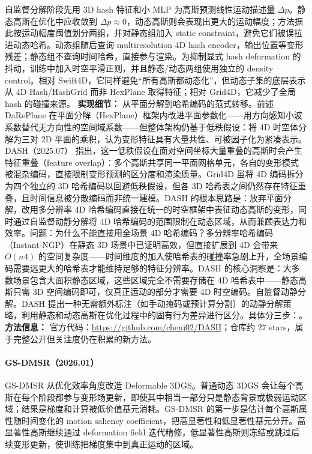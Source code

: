 自监督分解阶段先用 3D hash 特征和小 MLP 为高斯预测线性运动描述量 $\Delta p$。静态高斯在优化中应收敛到 $\Delta p\approx 0$，动态高斯则会表现出更大的运动幅度；方法据此按运动幅度阈值划分两组，并对静态组加入 static constraint，避免它们被误拉进动态哈希。动态组随后查询 multiresolution 4D hash encoder，输出位置等变形残差；静态组不查询时间哈希，直接参与渲染。为抑制显式 hash deformation 的抖动，训练中加入时空平滑正则，并且静态/动态两组使用独立的 density control。相对 Swift4D，它同样避免“所有高斯都动态化”，但动态子集的底层表示从 4D Hash/HashGrid 而非 HexPlane 取得特征；相对 Grid4D，它减少了全局 hash 的碰撞来源。
\textbf{实现细节：} 从平面分解到哈希编码的范式转移。前述 DaRePlane 在平面分解（HexPlane）框架内改进平面参数化——用方向感知小波系数替代无方向性的空间域系数——但整体架构仍基于低秩假设：将 4D 时空体分解为三对 2D 平面的乘积，认为变形特征具有大量共性、可被因子化为紧凑表示。DASH（2025.07） 指出，这一低秩假设在面对空间坐标大量重叠的高斯时会产生特征重叠（feature overlap）：多个高斯共享同一平面网格单元，各自的变形模式被混杂编码，直接限制变形预测的区分度和渲染质量。Grid4D 虽将 4D 编码拆分为四个独立的 3D 哈希编码以回避低秩假设，但各 3D 哈希表之间仍然存在特征重叠，且时间信息被分散编码而非统一建模。DASH 的根本思路是：放弃平面分解，改用多分辨率 4D 哈希编码直接在统一的时空框架中表征动态高斯的变形，同时通过自监督动静分解将 4D 哈希编码的范围限制在动态区域，从而兼顾表达力和效率。问题：为什么不能直接用全场景 4D 哈希编码？多分辨率哈希编码（Instant-NGP）在静态 3D 场景中已证明高效，但直接扩展到 4D 会带来 $O(n^{}4)$ 的空间复杂度——时间维度的加入使哈希表的碰撞率急剧上升，全场景编码需要远更大的哈希表才能维持足够的特征分辨率。DASH 的核心洞察是：大多数场景包含大面积静态区域，这些区域完全不需要存储在 4D 哈希表中——静态高斯只需 3D 空间编码即可，仅真正运动的部分才需要 4D 时空编码。自监督动静分解。DASH 提出一种无需额外标注（如手动掩码或预计算分割）的动静分解策略，利用静态和动态高斯在优化过程中的固有行为差异进行区分。具体分三步：。
\textbf{方法信息：} 官方代码：\url{https://github.com/chenj02/DASH}；仓库约 27 stars，属于完整公开但关注度仍在积累的新方法。



\paragraph{GS-DMSR（2026.01）\cite{2601_05584}}
GS-DMSR 从优化效率角度改造 Deformable 3DGS。普通动态 3DGS 会让每个高斯在每个阶段都参与变形场更新，即使其中相当一部分只是静态背景或极弱运动区域；结果是梯度和计算被低价值基元消耗。GS-DMSR 的第一步是估计每个高斯属性随时间变化的 motion saliency coefficient，把高显著性和低显著性基元分开。高显著性高斯继续通过 deformation field 迭代精修，低显著性高斯则冻结或跳过后续变形更新，使训练把梯度集中到真正运动的区域。

